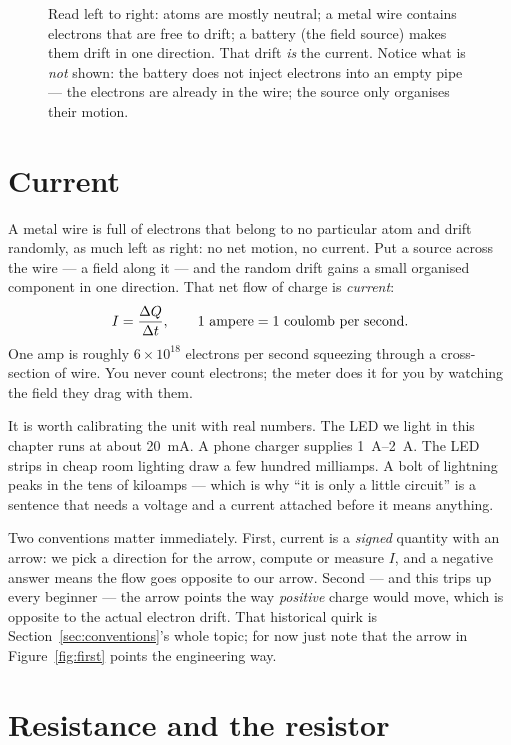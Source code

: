 \begin{figure}[htbp]
\centering

\caption{Read left to right: atoms are mostly neutral; a metal wire contains
electrons that are free to drift; a battery (the field source) makes them drift
in one direction. That drift \emph{is} the current. Notice what is \emph{not}
shown: the battery does not inject electrons into an empty pipe — the electrons
are already in the wire; the source only organises their motion.}
\label{fig:charge}
\end{figure}

\section{Current}
\label{sec:current}

A metal wire is full of electrons that belong to no particular atom and drift
randomly, as much left as right: no net motion, no current. Put a source across
the wire — a field along it — and the random drift gains a small organised
component in one direction. That net flow of charge is
\emph{current}:
\[
  I = \frac{\Delta Q}{\Delta t}, \qquad \text{1 ampere} = \text{1 coulomb per second}.
  \index{ampere}
\]
One amp is roughly $6\times10^{18}$ electrons per second squeezing through a
cross-section of wire. You never count electrons; the meter does it for you by
watching the field they drag with them.

It is worth calibrating the unit with real numbers. The LED we light in this
chapter runs at about \qty{20}{\milli\ampere}. A phone charger supplies
\qtyrange{1}{2}{\ampere}. The LED strips in cheap room lighting draw a few
hundred milliamps. A bolt of lightning peaks in the tens of kiloamps — which is
why ``it is only a little circuit'' is a sentence that needs a voltage and a
current attached before it means anything.

Two conventions matter immediately. First, current is a \emph{signed}
quantity with an arrow: we pick a direction for the arrow, compute or measure
$I$, and a negative answer means the flow goes opposite to our arrow. Second —
and this trips up every beginner — the arrow points the way \emph{positive}
charge would move, which is opposite to the actual electron drift. That
historical quirk is Section~\ref{sec:conventions}'s whole topic; for now just
note that the arrow in Figure~\ref{fig:first} points the engineering way.

\section{Resistance and the resistor}
\label{sec:resistance}

